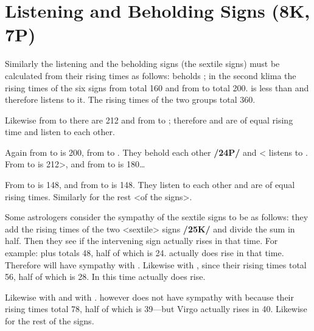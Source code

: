 \section{Listening and Beholding Signs (8K, 7P)}

Similarly the listening and the beholding signs (the sextile signs) must be calculated from their rising times as follows: \Pisces\xspace beholds \Taurus\xspace; in the second klima the rising times of the six signs from \Pisces\xspace <to Leo> total 160 and from \Taurus\xspace to \Libra\xspace total 200. \Pisces\xspace is less than \Taurus\xspace and therefore listens to it. The rising times of the two groups total 360. 

Likewise from \Gemini\xspace to \Scorpio\xspace there are 212 and from \Leo\xspace to \Capricorn\xspace 212; therefore \Gemini\xspace and \Leo\xspace are of equal rising time and listen to each other. 

Again from \Virgo\xspace to \Aquarius\xspace is 200, from \Scorpio\xspace to \Aries\xspace 160. They behold each other \textbf{/24P/} and <\Scorpio\xspace listens to \Virgo\xspace. From \Leo\xspace to \Capricorn\xspace is 212>, and from \Libra\xspace to \Pisces\xspace is 180\ldots 

From \Sagittarius\xspace to \Taurus\xspace is 148, and from \Aquarius\xspace to \Cancer\xspace is 148. They listen to each other and are of equal rising times. Similarly for the rest <of the signs>.

Some astrologers consider the sympathy of the sextile signs to be as follows: they add the rising times of the two <sextile> signs \textbf{/25K/} and divide the sum in half. Then they see if the intervening sign actually rises in that time. For example: \Aries\xspace 20 plus \Gemini\xspace 28 totals 48, half of which is 24. \Taurus\xspace actually does rise in that time. Therefore \Aries\xspace will have sympathy with \Gemini\xspace. Likewise \Taurus\xspace with \Cancer, since their rising times total 56, half of which is 28. In this time \Gemini\xspace actually does rise. 

Likewise \Gemini\xspace with \Leo\xspace and \Cancer\xspace with \Virgo. \Leo\xspace however does not have sympathy with \Libra\xspace because their rising times total 78, half of which is 39—but Virgo actually rises in 40. Likewise for the rest of the signs.

\newpage